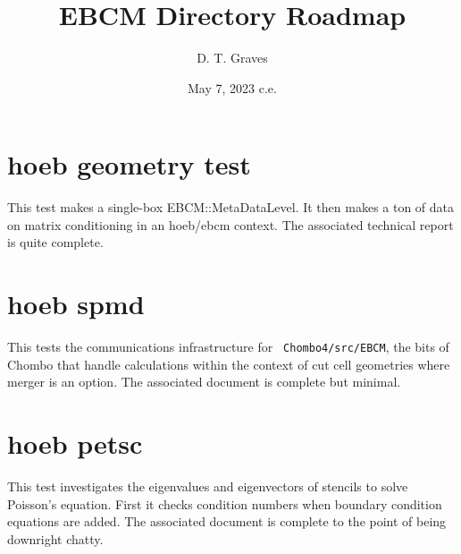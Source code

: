 \documentclass{article}
\begin{document}
\title{EBCM Directory Roadmap}
\author{ D. T. Graves }
\date{May 7, 2023 c.e.}
\maketitle

\section{hoeb geometry test}

This test makes a single-box EBCM::MetaDataLevel.  It then makes a ton
of data on matrix conditioning in an hoeb/ebcm context.    The
associated technical report is quite complete.

\section{hoeb spmd}

This tests the communications infrastructure for {\tt
Chombo4/src/EBCM}, the bits of Chombo that handle calculations
within the context of  cut cell geometries where merger is an option.
The associated document is complete but minimal.


\section{hoeb petsc}

This test investigates the eigenvalues and eigenvectors of stencils to
solve Poisson's equation.   First it checks condition numbers when
boundary condition equations are added.    The associated document is
complete to the point of being downright chatty.
\end{document}
